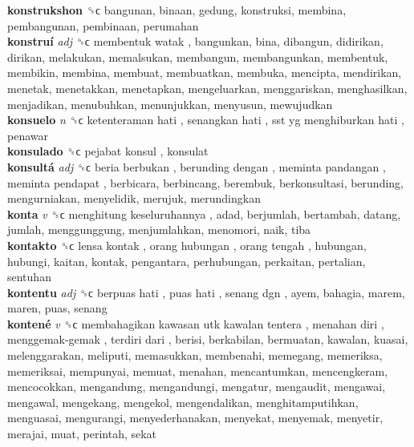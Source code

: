 \textbf{konstrukshon} ␝ϲ  bangunan, binaan, gedung, konstruksi, membina, pembangunan, pembinaan, perumahan  \\
\textbf{konstruí} \emph{adj}  ␝ϲ   membentuk watak , bangunkan, bina, dibangun, didirikan, dirikan, melakukan, memalsukan, membangun, membangunkan, membentuk, membikin, membina, membuat, membuatkan, membuka, mencipta, mendirikan, menetak, menetakkan, menetapkan, mengeluarkan, menggariskan, menghasilkan, menjadikan, menubuhkan, menunjukkan, menyusun, mewujudkan  \\
\textbf{konsuelo} \emph{n}  ␝ϲ   ketenteraman hati ,  senangkan hati ,  sst yg menghiburkan hati , penawar  \\
\textbf{konsulado} ␝ϲ   pejabat konsul , konsulat  \\
\textbf{konsultá} \emph{adj}  ␝ϲ   beria berbukan ,  berunding dengan ,  meminta pandangan ,  meminta pendapat , berbicara, berbincang, berembuk, berkonsultasi, berunding, mengurniakan, menyelidik, merujuk, merundingkan  \\
\textbf{konta} \emph{v}  ␝ϲ   menghitung keseluruhannya , adad, berjumlah, bertambah, datang, jumlah, menggunggung, menjumlahkan, menomori, naik, tiba  \\
\textbf{kontakto} ␝ϲ   lensa kontak ,  orang hubungan ,  orang tengah , hubungan, hubungi, kaitan, kontak, pengantara, perhubungan, perkaitan, pertalian, sentuhan  \\
\textbf{kontentu} \emph{adj}  ␝ϲ   berpuas hati ,  puas hati ,  senang dgn , ayem, bahagia, marem, maren, puas, senang  \\
\textbf{kontené} \emph{v}  ␝ϲ   membahagikan kawasan utk kawalan tentera ,  menahan diri ,  menggemak-gemak ,  terdiri dari , berisi, berkabilan, bermuatan, kawalan, kuasai, melenggarakan, meliputi, memasukkan, membenahi, memegang, memeriksa, memeriksai, mempunyai, memuat, menahan, mencantumkan, mencengkeram, mencocokkan, mengandung, mengandungi, mengatur, mengaudit, mengawai, mengawal, mengekang, mengekol, mengendalikan, menghitamputihkan, menguasai, mengurangi, menyederhanakan, menyekat, menyemak, menyetir, merajai, muat, perintah, sekat  \\
